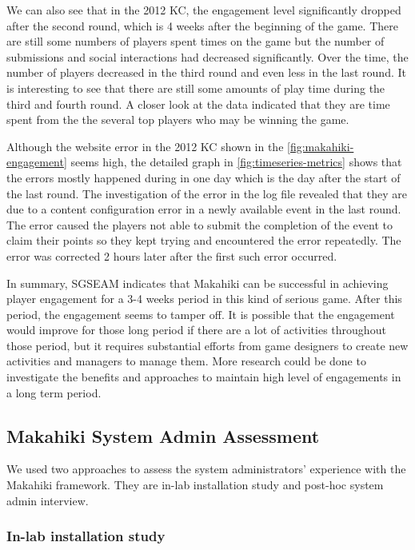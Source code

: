 We can also see that in the 2012 KC, the engagement level significantly dropped after the second round, which is 4 weeks after the beginning of the game. There are still some numbers of players spent times on the game but the number of submissions and social interactions had decreased significantly. Over the time, the number of players decreased in the third round and even less in the last round. It is interesting to see that there are still some amounts of play time during the third and fourth round. A closer look at the data indicated that they are time spent from the the several top players who may be winning the game. 

Although the website error in the 2012 KC shown in the  \autoref{fig:makahiki-engagement} seems high, the detailed graph in \autoref{fig:timeseries-metrics} shows that the errors mostly happened during in one day which is the day after the start of the last round. The investigation of the error in the log file revealed that they are due to a content configuration error in a newly available event in the last round. The error caused the players not able to submit the completion of the event to claim their points so they kept trying and encountered the error repeatedly. The error was corrected 2 hours later after the first such error occurred.

In summary, SGSEAM indicates that Makahiki can be successful in achieving player engagement for a 3-4 weeks period in this kind of serious game. After this period, the engagement seems to tamper off. It is possible that the engagement would improve for those long period if there are a lot of activities throughout those period, but it requires substantial efforts from game designers to create new activities and managers to manage them. More research could be done to investigate the benefits and approaches to maintain high level of engagements in a long term period.

\subsection{Makahiki System Admin Assessment}
We used two approaches to assess the system administrators' experience with the Makahiki framework. They are in-lab installation study and post-hoc system admin interview.

\subsubsection{In-lab installation study}

